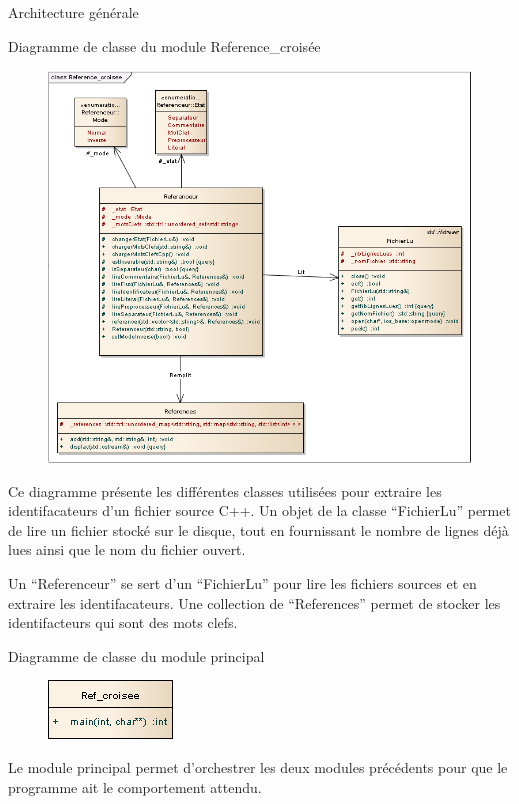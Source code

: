 \documentclass{article}
\begin{document}
\begin{section}{Architecture générale}
   \begin{subsection}{Diagramme de classe du module Reference\_croisée}
    \begin{figure}[!ht]
      \begin{center}
	\includegraphics[scale=0.5]{./diagrammeClasse_reference.png}
      \end{center}
    \end{figure}
    \FloatBarrier
     Ce diagramme présente les différentes classes utilisées pour extraire les identifacateurs d'un fichier source C++.
      Un objet de la classe ``FichierLu'' permet de lire un fichier stocké sur le disque, tout en fournissant le nombre de lignes déjà 
      lues ainsi que le nom du fichier ouvert. 
      
      Un ``Referenceur'' se sert d'un ``FichierLu'' pour lire les fichiers sources et en extraire les identifacateurs.
      Une collection de ``References'' permet de stocker les identifacteurs qui sont des mots clefs.
   \end{subsection}
   
   \newpage
    \begin{subsection}{Diagramme de classe du module principal}
    \begin{figure}[!ht]
      \begin{center}
	\includegraphics[scale=0.5]{./diagrammeClasse_main.png}
      \end{center}
    \end{figure}
    \FloatBarrier
    Le module principal permet d'orchestrer les deux modules précédents pour que le programme ait le comportement attendu.
   \end{subsection}


\end{section}
\end{document}
